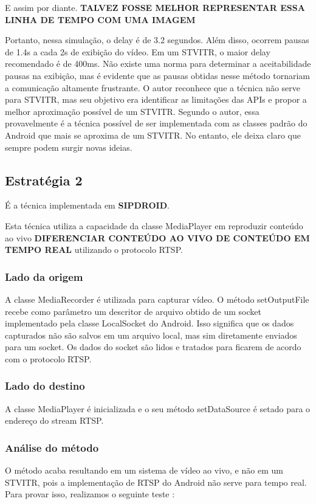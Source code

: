 \documentclass{acm_proc_article-sp}
\newcommand{\todo}[1]{\textcolor[rgb]{1.00,0.00,0.00}{\bf \uppercase{#1}}}
\begin{document}
E assim por diante. \todo{talvez fosse melhor representar essa linha de tempo com uma imagem}

Portanto, nessa simulação, o delay é de 3.2 segundos. Além disso, ocorrem pausas de 1.4s a cada 2s de exibição do vídeo. Em um STVITR, o maior delay recomendado é de 400ms. Não existe uma norma para determinar a aceitabilidade pausas na exibição, mas é evidente que as pausas obtidas nesse método tornariam a comunicação altamente frustrante. O autor reconhece que a técnica não serve para STVITR, mas seu objetivo era identificar as limitações das APIs e propor a melhor aproximação possível de um STVITR. Segundo o autor, essa provavelmente é a técnica possível de ser implementada com as classes padrão do Android que mais se aproxima de um STVITR. No entanto, ele deixa claro que sempre podem surgir novas ideias. 

\subsection{Estratégia 2}
É a técnica implementada em \todo{sipdroid}.

Esta técnica utiliza a capacidade da classe MediaPlayer em reproduzir conteúdo ao vivo \todo{diferenciar conteúdo ao vivo de conteúdo em tempo real} utilizando o protocolo RTSP.

\subsubsection{Lado da origem}
A classe MediaRecorder é utilizada para capturar vídeo. O método setOutputFile recebe como parâmetro um descritor de arquivo obtido de um socket implementado pela classe LocalSocket do Android. Isso significa que os dados capturados não são salvos em um arquivo local, mas sim diretamente enviados para um socket. Os dados do socket são lidos e tratados para ficarem de acordo com o protocolo RTSP.

\subsubsection{Lado do destino}
A classe MediaPlayer é inicializada e o seu método setDataSource é setado para o endereço do stream RTSP.

\subsubsection{Análise do método}
O método acaba resultando em um sistema de vídeo ao vivo, e não em um STVITR, pois a implementação de RTSP do Android não serve para tempo real. Para provar isso, realizamos o seguinte teste :
\end{document}
